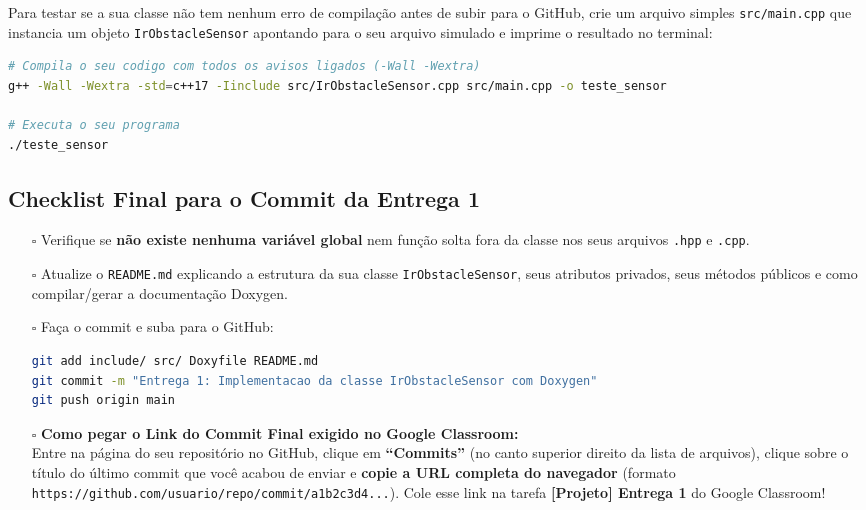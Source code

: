 \documentclass[11pt,a4paper]{article}
\begin{document}
Para testar se a sua classe não tem nenhum erro de compilação antes de subir para o GitHub, crie um arquivo simples \texttt{src/main.cpp} que instancia um objeto \texttt{IrObstacleSensor} apontando para o seu arquivo simulado e imprime o resultado no terminal:

\begin{lstlisting}[language=bash]
# Compila o seu codigo com todos os avisos ligados (-Wall -Wextra)
g++ -Wall -Wextra -std=c++17 -Iinclude src/IrObstacleSensor.cpp src/main.cpp -o teste_sensor

# Executa o seu programa
./teste_sensor
\end{lstlisting}

\subsection{Checklist Final para o Commit da Entrega 1}
\begin{enumerate}[leftmargin=*]
    \item[$\square$] Verifique se \textbf{não existe nenhuma variável global} nem função solta fora da classe nos seus arquivos \texttt{.hpp} e \texttt{.cpp}.
    \item[$\square$] Atualize o \texttt{README.md} explicando a estrutura da sua classe \texttt{IrObstacleSensor}, seus atributos privados, seus métodos públicos e como compilar/gerar a documentação Doxygen.
    \item[$\square$] Faça o commit e suba para o GitHub:
    \begin{lstlisting}[language=bash]
git add include/ src/ Doxyfile README.md
git commit -m "Entrega 1: Implementacao da classe IrObstacleSensor com Doxygen"
git push origin main
    \end{lstlisting}
    \item[$\square$] \textbf{Como pegar o Link do Commit Final exigido no Google Classroom:} \\
    Entre na página do seu repositório no GitHub, clique em \textbf{``Commits''} (no canto superior direito da lista de arquivos), clique sobre o título do último commit que você acabou de enviar e \textbf{copie a URL completa do navegador} (formato \texttt{https://github.com/usuario/repo/commit/a1b2c3d4...}). Cole esse link na tarefa \textbf{[Projeto] Entrega 1} do Google Classroom!
\end{enumerate}
\end{document}
